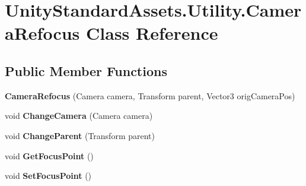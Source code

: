 \hypertarget{class_unity_standard_assets_1_1_utility_1_1_camera_refocus}{}\section{Unity\+Standard\+Assets.\+Utility.\+Camera\+Refocus Class Reference}
\label{class_unity_standard_assets_1_1_utility_1_1_camera_refocus}
\subsection*{Public Member Functions}
\begin{DoxyCompactItemize}
\item 
\mbox{\label{class_unity_standard_assets_1_1_utility_1_1_camera_refocus_ad18f0defd5d32b13fdfee175e4a5d9ba}} 
{\bfseries Camera\+Refocus} (Camera camera, Transform parent, Vector3 orig\+Camera\+Pos)
\item 
\mbox{\label{class_unity_standard_assets_1_1_utility_1_1_camera_refocus_a4b06686fe002ec8b589dd5e91b9251e5}} 
void {\bfseries Change\+Camera} (Camera camera)
\item 
\mbox{\label{class_unity_standard_assets_1_1_utility_1_1_camera_refocus_a3d41f2de5bf72909ace12fab7003a2bc}} 
void {\bfseries Change\+Parent} (Transform parent)
\item 
\mbox{\label{class_unity_standard_assets_1_1_utility_1_1_camera_refocus_ae40dc3974276cd4f3b39dbfff2c68996}} 
void {\bfseries Get\+Focus\+Point} ()
\item 
\mbox{\label{class_unity_standard_assets_1_1_utility_1_1_camera_refocus_a96116de559e0039593ceda8a97574b6c}} 
void {\bfseries Set\+Focus\+Point} ()
\end{DoxyCompactItemize}
